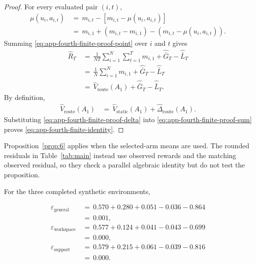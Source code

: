 \documentclass{article} %
\begin{document}
\begin{proof}
For every evaluated pair \((i,t)\),
\begin{align}
\label{eq:app-fourth-finite-proof-point}
\mu(u_i,a_{i,t})
&\,=\,
m_{i,t}
-
\left[
m_{i,t}-\mu(u_i,a_{i,t})
\right]
\\
&\,=\,
m_{i,1}
+
(m_{i,t}-m_{i,1})
-
(m_{i,t}-\mu(u_i,a_{i,t})).
\end{align}
Summing \eqref{eq:app-fourth-finite-proof-point} over \(i\) and \(t\) gives
\begin{align}
\label{eq:app-fourth-finite-proof-sum}
\widehat R_T
&\,=\,
\frac{1}{NT}
\sum_{i=1}^{N}
\sum_{t=1}^{T}
m_{i,1}
+
\widehat{\bar G}_T
-
\widehat{\bar L}_T
\\
&\,=\,
\frac{1}{N}
\sum_{i=1}^{N}
m_{i,1}
+
\widehat{\bar G}_T
-
\widehat{\bar L}_T
\\
&\,=\,
\widehat V_{\mathrm{route}}(A_1)
+
\widehat{\bar G}_T
-
\widehat{\bar L}_T.
\end{align}
By definition,
\begin{align}
\label{eq:app-fourth-finite-proof-delta}
\widehat V_{\mathrm{route}}(A_1)
&\,=\,
\widehat V_{\mathrm{static}}(A_1)
+
\widehat\Delta_{\mathrm{route}}(A_1).
\end{align}
Substituting \eqref{eq:app-fourth-finite-proof-delta} into \eqref{eq:app-fourth-finite-proof-sum} proves \eqref{eq:app-fourth-finite-identity}.
\end{proof}

Proposition~\ref{prop:6} applies when the selected-arm means are used. The
rounded residuals in Table~\ref{tab:main} instead use observed rewards and the
matching observed residual, so they check a parallel algebraic identity but do
not test the proposition.

For the three completed synthetic environments,

\begin{align}
\label{eq:app-fourth-residual-general}
\varepsilon_{\mathrm{general}}
&\,=\,
0.570+0.280+0.051-0.036-0.864
\\
&\,=\,
0.001,
\\[0.5em]
\label{eq:app-fourth-residual-workspace}
\varepsilon_{\mathrm{workspace}}
&\,=\,
0.577+0.124+0.041-0.043-0.699
\\
&\,=\,
0.000,
\\[0.5em]
\label{eq:app-fourth-residual-support}
\varepsilon_{\mathrm{support}}
&\,=\,
0.579+0.215+0.061-0.039-0.816
\\
&\,=\,
0.000.
\end{align}
\end{document}
